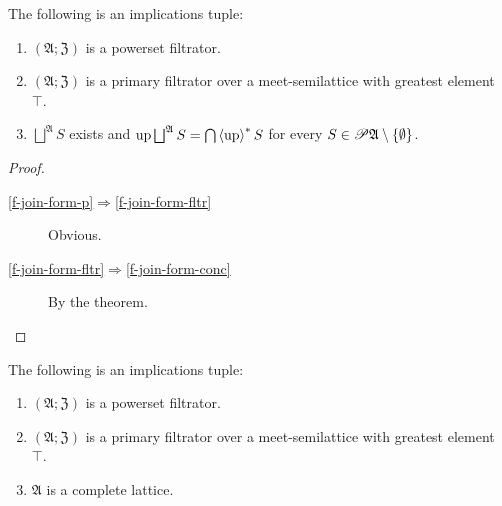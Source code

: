 \begin{cor}
\label{f-join-form}The following is an implications tuple:
\begin{enumerate}
\item \label{f-join-form-p}$(\mathfrak{A};\mathfrak{Z})$ is a powerset
filtrator.
\item \label{f-join-form-fltr}$(\mathfrak{A};\mathfrak{Z})$ is a primary
filtrator over a meet-semilattice with greatest element~$\top$.
\item \label{f-join-form-conc}$\bigsqcup^{\mathfrak{A}}S$ exists and $\operatorname{up}\bigsqcup^{\mathfrak{A}}S=\bigcap\left\langle \operatorname{up}\right\rangle ^{\ast}S$
for every $S\in\mathscr{P}\mathfrak{A}\setminus\{\emptyset\}$.
\end{enumerate}
\end{cor}
\begin{proof}
~
\begin{description}
\item [{\ref{f-join-form-p}$\Rightarrow$\ref{f-join-form-fltr}}] Obvious.
\item [{\ref{f-join-form-fltr}$\Rightarrow$\ref{f-join-form-conc}}] By
the theorem.
\end{description}
\end{proof}
\begin{cor}
\label{filt-is-complete}The following is an implications tuple:
\begin{enumerate}
\item $(\mathfrak{A};\mathfrak{Z})$ is a powerset filtrator.
\item $(\mathfrak{A};\mathfrak{Z})$ is a primary filtrator over a meet-semilattice
with greatest element~$\top$.
\item $\mathfrak{A}$ is a complete lattice.
\end{enumerate}
\end{cor}

